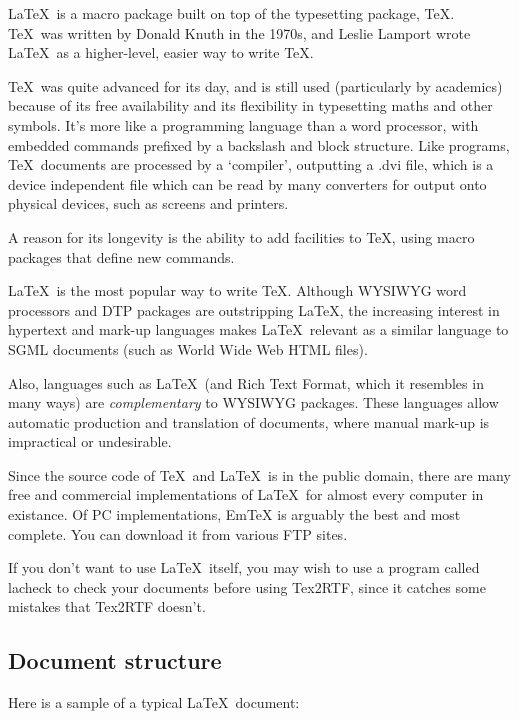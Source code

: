 \LaTeX\ is a macro package built on top of the typesetting package,
\TeX. \TeX\ was written by Donald Knuth in the 1970s, and Leslie
Lamport wrote \LaTeX\ as a higher-level, easier way to write \TeX.

\TeX\ was quite advanced for its day, and is still used (particularly by
academics) because of its free availability and its flexibility in
typesetting maths and other symbols. It's more like a programming
language than a word processor, with embedded commands prefixed by a
backslash and block structure. Like programs, \TeX\ documents are
processed by a `compiler', outputting a .dvi file, which is a device
independent file which can be read by many converters for output
onto physical devices, such as screens and printers.

A reason for its longevity is the ability to add facilities to
\TeX, using macro packages that define new commands.

\LaTeX\ is the most popular way to write \TeX. Although WYSIWYG
word processors and DTP packages are outstripping \LaTeX, the increasing
interest in hypertext and mark-up languages makes \LaTeX\ relevant as
a similar language to SGML documents (such as World Wide Web HTML files).

Also, languages such as \LaTeX\ (and Rich Text Format, which it resembles
in many ways) are {\it complementary} to WYSIWYG packages. These languages
allow automatic production and translation of documents, where manual
mark-up is impractical or undesirable.

Since the source code of \TeX\ and \LaTeX\ is in the public domain,
there are many free and commercial implementations of \LaTeX\ for almost
every computer in existance. Of PC implementations, EmTeX is arguably
the best and most complete. You can download it from various FTP sites.

If you don't want to use \LaTeX\ itself, you may wish to use a program
called lacheck to check your documents before using Tex2RTF, since it
catches some mistakes that Tex2RTF doesn't.

\subsection{Document structure}

Here is a sample of a typical \LaTeX\ document:

